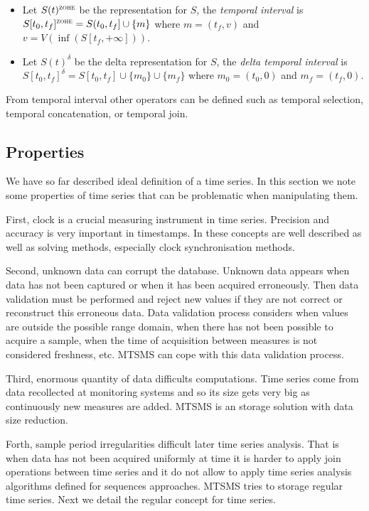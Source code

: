 \begin{itemize}
\item Let $S(t)^\zohe{}$ be the \zohe{} representation for $S$, the
  \emph{\zohe{} temporal interval} is $S[t_0,t_f]^\zohe{} = S(t_0,t_f]
  \cup \{m\}$ where $m=(t_f,v)$ and $v= V(\inf( S[t_f,+\infty] ))$.

\item Let $S(t)^\delta$ be the delta representation for $S$, the
  \emph{delta temporal interval} is $S[t_0,t_f]^\delta = S[t_0,t_f]
  \cup \{m_0\} \cup \{m_f\}$ where $m_0=(t_0,0)$ and $m_f=(t_f,0)$.
\end{itemize}



From temporal interval other operators can be defined such as temporal
selection, temporal concatenation, or temporal join.




\subsection{Properties}
\label{sec:model:properties}

We have so far described ideal definition of a time series. In this
section we note some properties of time series that can be problematic
when manipulating them.

First, clock is a crucial measuring instrument in time
series. Precision and accuracy is very important in timestamps.  In
\cite{kopetz11:realtime} these concepts are well described as well as
solving methods, especially clock synchronisation methods.


Second, unknown data can corrupt the database. Unknown data appears
when data has not been captured or when it has been acquired
erroneously. Then data validation must be performed and reject new
values if they are not correct or reconstruct this erroneous data.
Data validation process considers when values are outside the possible
range domain, when there has not been possible to acquire a sample,
when the time of acquisition between measures is not considered
freshness, etc. MTSMS can cope with this data validation process.


Third, enormous quantity of data difficults computations.  Time series
come from data recollected at monitoring systems and so its size gets
very big as continuously new measures are added.  MTSMS is an storage
solution with data size reduction.



Forth, sample period irregularities difficult later time series
analysis. That is when data has not been acquired uniformly at time it
is harder to apply join operations between time series and it do not
allow to apply time series analysis algorithms defined for sequences
approaches.  MTSMS tries to storage regular time series.  Next we
detail the regular concept for time series.


